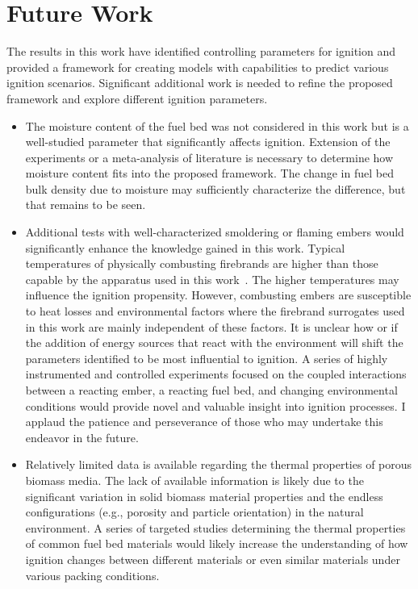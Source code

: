 
\chapter{Future Work}
\label{chap:futureWork}

  The results in this work have identified controlling parameters for ignition and provided a framework for creating models with capabilities to predict various ignition scenarios. Significant additional work is needed to refine the proposed framework and explore different ignition parameters. 
        \begin{itemize}
            \item The moisture content of the fuel bed was not considered in this work but is a well-studied parameter that significantly affects ignition. Extension of the experiments or a meta-analysis of literature is necessary to determine how moisture content fits into the proposed framework. The change in fuel bed bulk density due to moisture may sufficiently characterize the difference, but that remains to be seen.
            
            \item Additional tests with well-characterized smoldering or flaming embers would significantly enhance the knowledge gained in this work. Typical temperatures of physically combusting firebrands are higher than those capable by the apparatus used in this work~\cite{Fateev2017a}. The higher temperatures may influence the ignition propensity. However, combusting embers are susceptible to heat losses and environmental factors where the firebrand surrogates used in this work are mainly independent of these factors. It is unclear how or if the addition of energy sources that react with the environment will shift the parameters identified to be most influential to ignition. A series of highly instrumented and controlled experiments focused on the coupled interactions between a reacting ember, a reacting fuel bed, and changing environmental conditions would provide novel and valuable insight into ignition processes. I applaud the patience and perseverance of those who may undertake this endeavor in the future. 
            
            \item Relatively limited data is available regarding the thermal properties of porous biomass media. The lack of available information is likely due to the significant variation in solid biomass material properties and the endless configurations (e.g., porosity and particle orientation) in the natural environment. A series of targeted studies determining the thermal properties of common fuel bed materials would likely increase the understanding of how ignition changes between different materials or even similar materials under various packing conditions.
            

\end{itemize}
